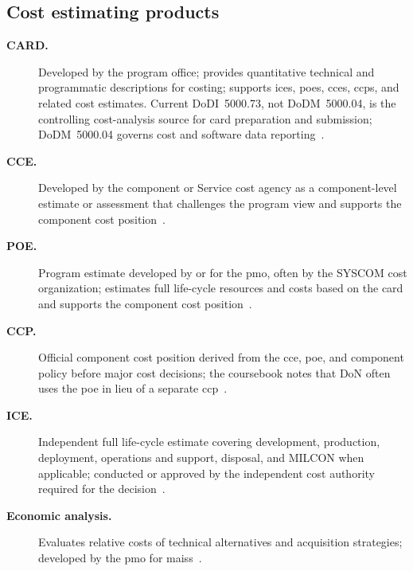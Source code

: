 \documentclass[../main.tex]{subfiles}
\begin{document}
\subsection{Cost estimating products}
\begin{description}
  \item[\textbf{CARD.}] Developed by the program office; provides quantitative technical and programmatic descriptions for costing; supports \acp{ice}, \acp{poe}, \acp{cce}, \acp{ccp}, and related cost estimates. Current DoDI~5000.73, not DoDM~5000.04, is the controlling cost-analysis source for \ac{card} preparation and submission; DoDM~5000.04 governs cost and software data reporting~\autocite{edo-3-1-6-cost-estimating-2024,DoDI5000-73-Cost-Analysis-2024,DoDM5000-04-CSDR-2021}.
  \item[\textbf{CCE.}] Developed by the component or Service cost agency as a component-level estimate or assessment that challenges the program view and supports the component cost position~\autocite{edo-3-1-6-cost-estimating-2024,DoDI5000-73-Cost-Analysis-2024}.
  \item[\textbf{POE.}] Program estimate developed by or for the \ac{pmo}, often by the SYSCOM cost organization; estimates full life-cycle resources and costs based on the \ac{card} and supports the component cost position~\autocite{edo-3-1-6-cost-estimating-2024,DoDI5000-73-Cost-Analysis-2024}.
  \item[\textbf{CCP.}] Official component cost position derived from the \ac{cce}, \ac{poe}, and component policy before major cost decisions; the coursebook notes that DoN often uses the \ac{poe} in lieu of a separate \ac{ccp}~\autocite{edo-3-1-6-cost-estimating-2024,DoDI5000-73-Cost-Analysis-2024}.
  \item[\textbf{ICE.}] Independent full life-cycle estimate covering development, production, deployment, operations and support, disposal, and MILCON when applicable; conducted or approved by the independent cost authority required for the decision~\autocite{edo-3-1-6-cost-estimating-2024,DoDI5000-73-Cost-Analysis-2024}.
  \item[\textbf{Economic analysis.}] Evaluates relative costs of technical alternatives and acquisition strategies; developed by the \ac{pmo} for \acp{mais}~\autocite{edo-3-1-6-cost-estimating-2024}.
\end{description}
\end{document}
